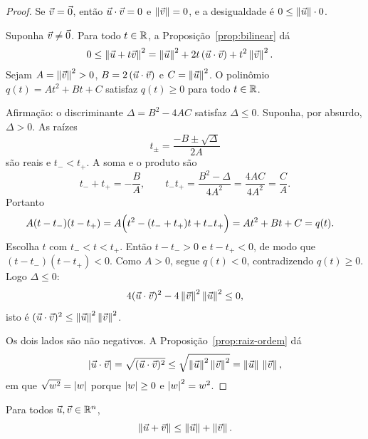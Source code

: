 \documentclass[11pt,a4paper]{article}
\begin{document}
\begin{proof}
Se $\vec{v}=\vec{0}$, então $\vec{u}\cdot\vec{v}=0$ e $\left\lVert \vec{v} \right\rVert=0$, e a desigualdade é $0\le\left\lVert \vec{u} \right\rVert\cdot 0$.

Suponha $\vec{v}\neq\vec{0}$. Para todo $t\in\mathbb{R}$, a Proposição~\ref{prop:bilinear} dá
\begin{align*}
0\le\left\lVert \vec{u}+t\vec{v} \right\rVert^2
&=\left\lVert \vec{u} \right\rVert^2+2t\,(\vec{u}\cdot\vec{v})+t^2\left\lVert \vec{v} \right\rVert^2.
\end{align*}
Sejam $A=\left\lVert \vec{v} \right\rVert^2>0$, $B=2\,(\vec{u}\cdot\vec{v})$ e $C=\left\lVert \vec{u} \right\rVert^2$. O polinômio $q(t)=At^2+Bt+C$ satisfaz $q(t)\ge 0$ para todo $t\in\mathbb{R}$.

Afirmação: o discriminante $\Delta=B^2-4AC$ satisfaz $\Delta\le 0$. Suponha, por absurdo, $\Delta>0$. As raízes
\[
t_{\pm}=\frac{-B\pm\sqrt{\Delta}}{2A}
\]
são reais e $t_-<t_+$. A soma e o produto são
\[
t_-+t_+=-\frac{B}{A},\qquad t_-t_+=\frac{B^2-\Delta}{4A^2}=\frac{4AC}{4A^2}=\frac{C}{A}.
\]
Portanto
\begin{align*}
A(t-t_-)(t-t_+)
&=A\Bigl(t^2-(t_-+t_+)t+t_-t_+\Bigr)
=At^2+Bt+C=q(t).
\end{align*}
Escolha $t$ com $t_-<t<t_+$. Então $t-t_->0$ e $t-t_+<0$, de modo que $(t-t_-)(t-t_+)<0$. Como $A>0$, segue $q(t)<0$, contradizendo $q(t)\ge 0$. Logo $\Delta\le 0$:
\[
4(\vec{u}\cdot\vec{v})^2-4\left\lVert \vec{v} \right\rVert^2\left\lVert \vec{u} \right\rVert^2\le 0,
\]
isto é $(\vec{u}\cdot\vec{v})^2\le\left\lVert \vec{u} \right\rVert^2\left\lVert \vec{v} \right\rVert^2$.

Os dois lados são não negativos. A Proposição~\ref{prop:raiz-ordem} dá
\[
\left\lvert \vec{u}\cdot\vec{v} \right\rvert
=\sqrt{(\vec{u}\cdot\vec{v})^2}
\le\sqrt{\left\lVert \vec{u} \right\rVert^2\left\lVert \vec{v} \right\rVert^2}
=\left\lVert \vec{u} \right\rVert\,\left\lVert \vec{v} \right\rVert,
\]
em que $\sqrt{w^2}=\left\lvert w \right\rvert$ porque $\left\lvert w \right\rvert\ge 0$ e $\left\lvert w \right\rvert^2=w^2$.
\end{proof}

\begin{teorema}\label{teo:triangular-norma}
Para todos $\vec{u},\vec{v}\in\mathbb{R}^n$,
\[
\left\lVert \vec{u}+\vec{v} \right\rVert\le\left\lVert \vec{u} \right\rVert+\left\lVert \vec{v} \right\rVert.
\]
\end{teorema}
\end{document}
